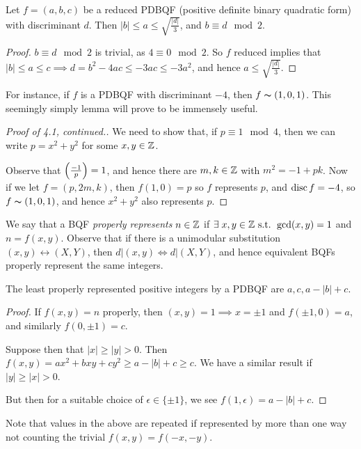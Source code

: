 \documentclass[10pt,a4paper]{article}
\begin{document}
\begin{lemma}
Let $f = (a,b,c)$ be a reduced PDBQF (positive definite binary quadratic form) with discriminant $d$. Then $|b| \leq a \leq \sqrt{\frac{|d|}{3}}$, and $b \equiv d \mod 2$.
\end{lemma}
\begin{proof}
$b\equiv d \mod 2$ is trivial, as $4 \equiv 0 \mod 2$. So $f$ reduced implies that $|b| \leq a \leq c \implies d = b^2-4ac \leq -3ac \leq -3a^2$, and hence $a \leq \sqrt{\frac{|d|}{3}}$.
\end{proof}
For instance, if $f$ is a PDBQF with discriminant $-4$, then $f \thicksim (1,0,1)$. This seemingly simply lemma will prove to be immensely useful.

\begin{proof}[Proof of 4.1, continued.]
We need to show that, if $p \equiv 1 \mod 4$, then we can write $p = x^2 + y^2$ for some $x,y \in \mathbb{Z}$.

Observe that $\left(\frac{-1}{p}\right) = 1$, and hence there are $m,k \in \mathbb{Z}$ with $m^2 = -1 + pk$. Now if we let $f = (p, 2m, k)$, then $f(1,0) = p$ so $f$ represents $p$, and $\operatorname{disc} f = -4$, so $f \thicksim (1,0,1)$, and hence $x^2+ y^2$ also represents $p$.
\end{proof}
We say that a BQF \emph{properly represents} $n \in \mathbb{Z}$ if $\exists x,y \in \Z \st \gcd(x,y) = 1$ and $n= f(x,y)$. Observe that if there is a unimodular substitution $(x,y)\leftrightarrow (X,Y)$, then $d|(x,y) \iff d|(X,Y)$, and hence equivalent BQFs properly represent the same integers.

\begin{lemma}
The least properly represented positive integers by a PDBQF are $a, c, a-|b|+c$.
\end{lemma}
\begin{proof}
If $f(x,y) =n$ properly, then $(x,y) = 1 \implies x = \pm 1$ and $f(\pm 1, 0) = a$, and similarly $f(0,\pm 1) = c$.

Suppose then that $|x| \geq |y| > 0$. Then $f(x,y) = ax^2 + bxy +cy^2 \geq a - |b|+c \geq c$. We have a similar result if $|y| \geq |x| > 0$.

But then for a suitable choice of $\epsilon \in \{\pm 1\}$, we see $f(1,\epsilon) = a - |b|+c$.
\end{proof}
Note that values in the above are repeated if represented by more than one way not counting the trivial $f(x,y) = f(-x,-y)$.
\end{document}
